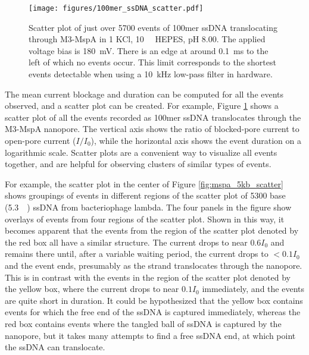 \begin{figure}[h]
\begin{centering}
\texttt{[image: figures/100mer\_ssDNA\_scatter.pdf]}
\caption[Scatter plot of 100mer ssDNA in MspA]{Scatter plot of just over 5700 events of 100mer ssDNA translocating through M3-MspA in \SI{1}{\Molar} KCl, \SI{10}{\milli\Molar} HEPES, pH \num{8.00}.  The applied voltage bias is \SI{180}{\mV}.  There is an edge at around \SI{0.1}{ms} to the left of which no events occur.  This limit corresponds to the shortest events detectable when using a \SI{10}{\kHz} low-pass filter in hardware.}
\label{fig:mspa_100mer_scatter}
\end{centering}
\end{figure}

The mean current blockage and duration can be computed for all the events observed, and a scatter plot can be created.  For example, Figure \ref{fig:mspa_100mer_scatter} shows a scatter plot of all the events recorded as \num{100}mer ssDNA translocates through the M3-MspA nanopore.  The vertical axis shows the ratio of blocked-pore current to open-pore current ($I/I_0$), while the horizontal axis shows the event duration on a logarithmic scale.  Scatter plots are a convenient way to visualize all events together, and are helpful for observing clusters of similar types of events.

For example, the scatter plot in the center of Figure \ref{fig:mspa_5kb_scatter} shows groupings of events in different regions of the scatter plot of \num{5300} base (\SI{5.3}{\kilo\base}) ssDNA from bacteriophage lambda.  The four panels in the figure show overlays of events from four regions of the scatter plot.  Shown in this way, it becomes apparent that the events from the region of the scatter plot denoted by the red box all have a similar structure.  The current drops to near $0.6 I_0$ and remains there until, after a variable waiting period, the current drops to $<0.1 I_0$ and the event ends, presumably as the strand translocates through the nanopore.  This is in contrast with the events in the region of the scatter plot denoted by the yellow box, where the current drops to near $0.1 I_0$ immediately, and the events are quite short in duration.  It could be hypothesized that the yellow box contains events for which the free end of the ssDNA is captured immediately, whereas the red box contains events where the tangled ball of ssDNA is captured by the nanopore, but it takes many attempts to find a free ssDNA end, at which point the ssDNA can translocate.

